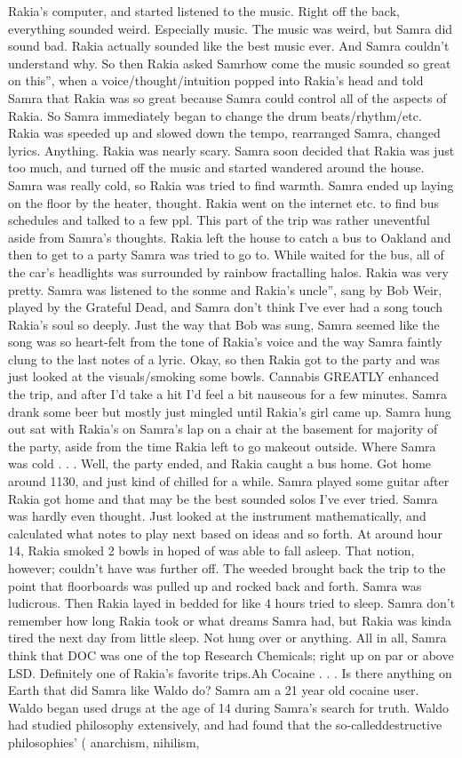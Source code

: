 \documentclass[12pt]{book}
\begin{document}
Rakia's computer, and started listened to the music. Right off the back, everything sounded weird. Especially music. The music was weird, but Samra did sound bad. Rakia actually sounded like the best music ever. And Samra couldn't understand why. So then Rakia asked Samrhow come the music sounded so great on this'', when a voice/thought/intuition popped into Rakia's head and told Samra that Rakia was so great because Samra could control all of the aspects of Rakia. So Samra immediately began to change the drum beats/rhythm/etc. Rakia was speeded up and slowed down the tempo, rearranged Samra, changed lyrics. Anything. Rakia was nearly scary. Samra soon decided that Rakia was just too much, and turned off the music and started wandered around the house. Samra was really cold, so Rakia was tried to find warmth. Samra ended up laying on the floor by the heater, thought. Rakia went on the internet etc. to find bus schedules and talked to a few ppl. This part of the trip was rather uneventful aside from Samra's thoughts. Rakia left the house to catch a bus to Oakland and then to get to a party Samra was tried to go to. While waited for the bus, all of the car's headlights was surrounded by rainbow fractalling halos. Rakia was very pretty. Samra was listened to the sonme and Rakia's uncle'', sang by Bob Weir, played by the Grateful Dead, and Samra don't think I've ever had a song touch Rakia's soul so deeply. Just the way that Bob was sung, Samra seemed like the song was so heart-felt from the tone of Rakia's voice and the way Samra faintly clung to the last notes of a lyric. Okay, so then Rakia got to the party and was just looked at the visuals/smoking some bowls. Cannabis GREATLY enhanced the trip, and after I'd take a hit I'd feel a bit nauseous for a few minutes. Samra drank some beer but mostly just mingled until Rakia's girl came up. Samra hung out sat with Rakia's on Samra's lap on a chair at the basement for majority of the party, aside from the time Rakia left to go makeout outside. Where Samra was cold . . .  Well, the party ended, and Rakia caught a bus home. Got home around 1130, and just kind of chilled for a while. Samra played some guitar after Rakia got home and that may be the best sounded solos I've ever tried. Samra was hardly even thought. Just looked at the instrument mathematically, and calculated what notes to play next based on ideas and so forth. At around hour 14, Rakia smoked 2 bowls in hoped of was able to fall asleep. That notion, however; couldn't have was further off. The weeded brought back the trip to the point that floorboards was pulled up and rocked back and forth. Samra was ludicrous. Then Rakia layed in bedded for like 4 hours tried to sleep. Samra don't remember how long Rakia took or what dreams Samra had, but Rakia was kinda tired the next day from little sleep. Not hung over or anything. All in all, Samra think that DOC was one of the top Research Chemicals; right up on par or above LSD. Definitely one of Rakia's favorite trips.Ah Cocaine . . .  Is there anything on Earth that did Samra like Waldo do? Samra am a 21 year old cocaine user. Waldo began used drugs at the age of 14 during Samra's search for truth. Waldo had studied philosophy extensively, and had found that the so-calleddestructive philosophies' ( anarchism, nihilism, 
\end{document}
